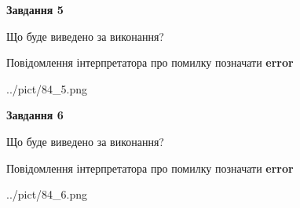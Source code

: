 \documentclass[12pt, ukrainian]{article}
\begin{document}
{{\begin {center}\textbf{Завдання 5}\end {center}}\par
Що буде виведено за виконання? \par
Повідомлення інтерпретатора про помилку позначати \textbf{error}

\begin{center}
	{../pict/84_5.png}
\end{center}
\newpage

{\begin {center}\textbf{Завдання 6}\end {center}}\par
Що буде виведено за виконання? \par
Повідомлення інтерпретатора про помилку позначати \textbf{error}

\begin{center}
	{../pict/84_6.png}
\end{center}
\newpage

}
\end{document}
